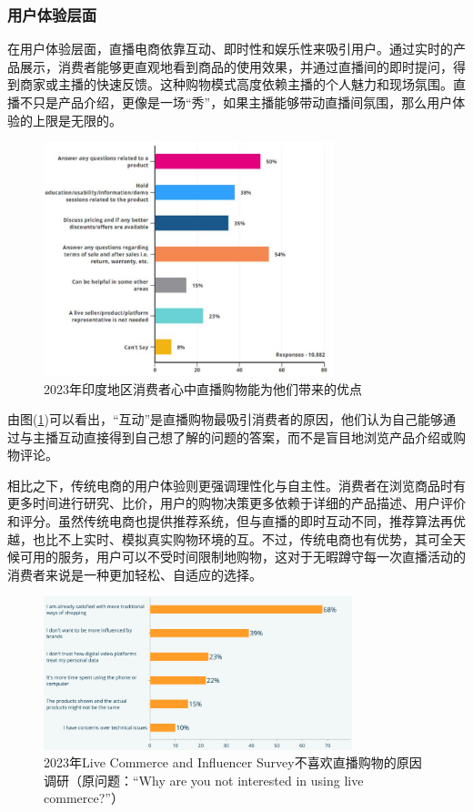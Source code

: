 \documentclass[12pt]{ctexart}
\begin{document}
\subsubsection{用户体验层面}

在用户体验层面，直播电商依靠互动、即时性和娱乐性来吸引用户。通过实时的产品展示，消费者能够更直观地看到商品的使用效果，并通过直播间的即时提问，得到商家或主播的快速反馈。这种购物模式高度依赖主播的个人魅力和现场氛围。直播不只是产品介绍，更像是一场“秀”，如果主播能够带动直播间氛围，那么用户体验的上限是无限的。

\begin{figure}[htbp!]
    \centering
    \includegraphics[width=0.75\textwidth]{Images/16.png}
    \caption{2023年印度地区消费者心中直播购物能为他们带来的优点\cite{20}}
    \label{interest_india}
\end{figure}

由图(\ref{interest_india})可以看出，“互动”是直播购物最吸引消费者的原因，他们认为自己能够通过与主播互动直接得到自己想了解的问题的答案，而不是盲目地浏览产品介绍或购物评论。

相比之下，传统电商的用户体验则更强调理性化与自主性。消费者在浏览商品时有更多时间进行研究、比价，用户的购物决策更多依赖于详细的产品描述、用户评价和评分。虽然传统电商也提供推荐系统，但与直播的即时互动不同，推荐算法再优越，也比不上实时、模拟真实购物环境的互。不过，传统电商也有优势，其可全天候可用的服务，用户可以不受时间限制地购物，这对于无暇蹲守每一次直播活动的消费者来说是一种更加轻松、自适应的选择。

\begin{figure}[htbp!]
    \centering
    \includegraphics[width=0.8\textwidth]{Images/17.png}
    \caption{2023年Live Commerce and Influencer Survey不喜欢直播购物的原因调研（原问题：“Why are you not interested in using live commerce?”）\cite{21}}
    \label{hate}
\end{figure}
\end{document}
